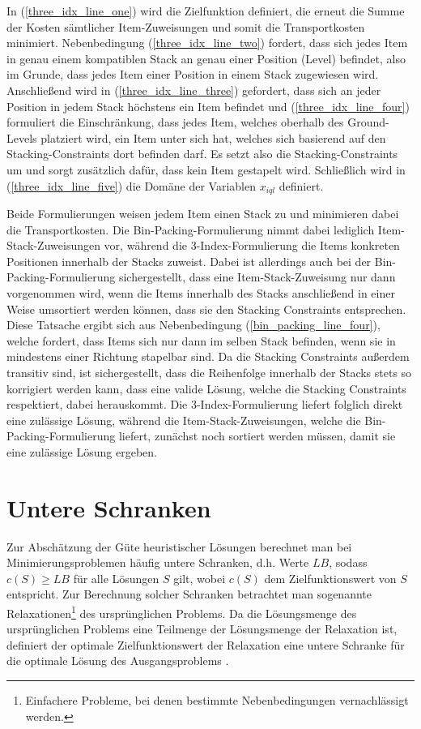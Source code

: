 In (\ref{three_idx_line_one}) wird die Zielfunktion definiert, die erneut die Summe der Kosten sämtlicher Item-Zuweisungen
und somit die Transportkosten minimiert.
Nebenbedingung (\ref{three_idx_line_two}) fordert, dass sich jedes Item in genau einem kompatiblen Stack an genau
einer Position (Level) befindet,
also im Grunde, dass jedes Item einer Position in einem Stack zugewiesen wird.
Anschließend wird in (\ref{three_idx_line_three}) gefordert, dass sich an jeder Position in jedem Stack höchstens ein Item befindet und
(\ref{three_idx_line_four}) formuliert die Einschränkung, dass jedes Item, welches oberhalb des Ground-Levels platziert wird,
ein Item unter sich hat, welches sich basierend auf den Stacking-Constraints dort befinden darf.
Es setzt also die Stacking-Constraints um und sorgt zusätzlich dafür, dass kein Item  gestapelt wird.
Schließlich wird in (\ref{three_idx_line_five}) die Domäne der Variablen $x_{iql}$ definiert.

Beide Formulierungen weisen jedem Item einen Stack zu und minimieren dabei die Transportkosten.
Die Bin-Packing-Formulierung nimmt dabei lediglich Item-Stack-Zuweisungen vor, während die 3-Index-Formulierung die
Items konkreten Positionen innerhalb der Stacks zuweist. Dabei ist allerdings auch bei der Bin-Packing-Formulierung
sichergestellt, dass eine Item-Stack-Zuweisung nur dann vorgenommen wird, wenn die Items innerhalb des Stacks anschließend
in einer Weise umsortiert werden können, dass sie den Stacking Constraints entsprechen. Diese Tatsache ergibt sich aus Nebenbedingung (\ref{bin_packing_line_four}), welche fordert, dass Items sich nur dann im selben Stack befinden, wenn sie in mindestens einer Richtung stapelbar sind.
Da die Stacking Constraints außerdem transitiv sind, ist sichergestellt, dass die Reihenfolge innerhalb der Stacks stets so korrigiert werden kann, dass eine valide Lösung, welche die Stacking Constraints respektiert, dabei herauskommt.
Die 3-Index-Formulierung liefert folglich direkt eine zulässige Lösung, während die Item-Stack-Zuweisungen, welche die Bin-Packing-Formulierung liefert, zunächst noch sortiert werden müssen, damit sie eine zulässige Lösung ergeben.

\section{Untere Schranken}
\label{sec:lower_bounds}

Zur Abschätzung der Güte heuristischer Lösungen berechnet man bei Minimierungsproblemen häufig untere Schranken,
d.h. Werte $LB$, sodass $c(S) \geq LB$ für alle Lösungen $S$ gilt, wobei $c(S)$ dem Zielfunktionswert von $S$ entspricht.
Zur Berechnung solcher Schranken betrachtet man sogenannte Relaxationen\footnote{Einfachere Probleme, bei denen bestimmte Nebenbedingungen vernachlässigt werden.} des ursprünglichen Problems.
Da die Lösungsmenge des ursprünglichen Problems eine Teilmenge der Lösungsmenge der Relaxation ist,
definiert der optimale Zielfunktionswert der Relaxation eine untere Schranke für die optimale Lösung des Ausgangsproblems
\cite{Knust2017}.

